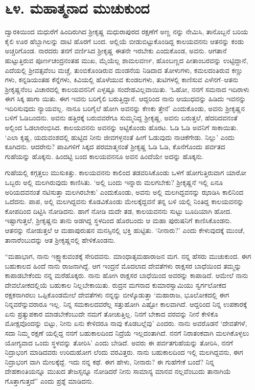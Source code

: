
\chapter{೬೪. ಮಹಾತ್ಮನಾದ ಮುಚುಕುಂದ}

ದ್ವಾರಕಿಯಿಂದ ಮಧುರೆಗೆ ಹಿಂದಿರುಗಿದ ಶ್ರೀಕೃಷ್ಣ ಮಧುರಾಪುರದ ರಕ್ಷಣೆಗೆ ಅಣ್ಣ ನನ್ನು ನೇಮಿಸಿ, ತಾನೊಬ್ಬನೆ ಬರಿಯ ಕೈಲಿ ಊರ ಹೆಬ್ಬಾಗಿಲನ್ನು ದಾಟಿ ಹೊರಗೆ ಬಂದ. ಅಲ್ಲಿಯೆ ಬೀಡುಬಿಟ್ಟುಕೊಂಡಿದ್ದ ಕಾಲಯವನನು ಆತನನ್ನು ಕಂಡು ಅಚ್ಚರಿಗೊಂಡ. ನಾರದರು ತನಗೆ ವರ್ಣಿಸಿದ ಶ್ರೀಕೃಷ್ಣ ಈತನೇ ಇರಬೇಕು ಎಂದುಕೊಂಡ, ಅವನು. ಆಗತಾನೆ ಹುಟ್ಟುತ್ತಿರುವ ಪೂರ್ಣಚಂದ್ರನಂತಹ ಮುಖ, ಮೈಯೆಲ್ಲ ಶಾಮಲವರ್ಣ, ಹೊಂಬಣ್ಣದ ಪೀತಾಂಬರವನ್ನು ಉಟ್ಟಿದ್ದಾನೆ, ಎದೆಯಲ್ಲಿ ಶ್ರೀವತ್ಸವೆಂಬ ಮಚ್ಚೆ, ತುಂಬಿಕೊಂಡಿರುವ ದುಂಡನೆಯ ನಿಡಿದಾದ ತೋಳುಗಳು, ಕಮಲದಂತಿರುವ ಕಣ್ಣು ಗಳು, ಕನ್ನಡಿಯಂತಹ ಕೆನ್ನೆಗಳು, ಕಿವಿಯಲ್ಲಿ ಹೊಳೆಯುವ ಕುಂಡಲಗಳು, ತುಟಿಗಳಲ್ಲಿ ಕಾಣಿಸುವ ಎಳೆನಗೆ–ಆತನು ಶ್ರೀಕೃಷ್ಣನೆಂಬ ವಿಚಾರದಲ್ಲಿ ಕಾಲಯವನನಿಗೆ ಎಳ್ಳಷ್ಟೂ ಸಂದೇಹವಿಲ್ಲವಾಯಿತು. ‘ಓಹೋ, ನನಗೆ ಸಮನಾದ ಇದಿರಾಳು ಈಗ ಸಿಕ್ಕ ಹಾಗಾ ಯಿತು. ಈಗ ಇವನು ಬರಿಗೈಲಿ ಬರುತ್ತಿದ್ದಾನೆ. ಆದ್ದರಿಂದ ನಾನು ಆಯುಧವನ್ನು ಹಿಡಿದು ಇವನನ್ನು ಇದಿರಿಸುವುದು ನ್ಯಾಯವಲ್ಲ. ನಾನೂ ಬರಿಗೈಲೆ ಹೋಗಿ ಅವನನ್ನು ಕೆಣಕು ತ್ತೇನೆ’ ಎಂದುಕೊಂಡು, ಅವನು ಶ್ರೀಕೃಷ್ಣನ ಬಳಿಗೆ ಓಡಿಬಂದನು. ಅವನು ಹತ್ತಿರಕ್ಕೆ ಬರುವವರೆಗೂ ಸುಮ್ಮನಿದ್ದ ಶ್ರೀಕೃಷ್ಣ, ಅವನು ಬರುತ್ತಲೆ, ಹೆದರಿದವನಂತೆ ಅಲ್ಲಿಂದ ಓಡಲಾರಂಭಿಸಿದ. ಕಾಲಯವನನು ಅವನನ್ನು ಅಟ್ಟಿಕೊಂಡು ಹೊರಟ. ಓಡಿ ಓಡಿ ಅವನಿಗೆ ಸಾಕಾಯಿತು. ‘ಎಲಾ ಕೃಷ್ಣ, ಯದುವಂಶದಲ್ಲಿ ಹುಟ್ಟಿದ ನೀನು ಜೀವಗಳ್ಳನಂತೆ ಹೀಗೆ ಓಡುವುದು ನಾಚಿಕೆಗೇಡು. ನಿಲ್ಲು’ ಎಂದು ಕೂಗಿದನು. ಆದರೇನು? ಪಾಪಿಗಳಿಗೆ ಸಿಕ್ಕದ ಪರಮಾತ್ಮನಂತೆ ಶ್ರೀಕೃಷ್ಣ ಓಡಿ ಓಡಿ, ಕೊನೆಗೊಂದು ಪರ್ವತದ ಗುಹೆಯನ್ನು ಹೊಕ್ಕನು. ಹಿಂದಟ್ಟಿ ಬಂದ ಕಾಲಯವನನೂ ಅವನ ಹಿಂದೆಯೇ ಅದನ್ನು ಹೊಕ್ಕನು.

ಗುಹೆಯಲ್ಲಿ ಕಗ್ಗತ್ತಲು ಮುಸುಕಿತ್ತು. ಕಾಲಯವನನು ಕಾಲಿಂದ ತಡವರಿಸಿಕೊಂಡು ಒಳಗೆ ಹೋಗುತ್ತಿರುವಾಗ ಯಾರೋ ಒಬ್ಬರು ಅಲ್ಲಿ ಮಲಗಿರುವುದು ಕಾಣಿಸಿತು. ‘ಅಲ್ಲಿ ಬಂದು ಇನ್ನಾರು ಮಲಗಬೇಕು? ಶ್ರೀಕೃಷ್ಣನೆ ಇಲ್ಲಿ ಏನೂ ಅರಿಯದವನಂತೆ ನಟಿಸುತ್ತಾ ಮಲಗಿರಬೇಕು’ ಎಂದುಕೊಂಡು, ಅವನು ಅಲ್ಲಿ ಮಲಗಿದ್ದವನನ್ನು ಝಾಡಿಸಿ ಕಾಲಿನಿಂದ ಒದೆದನು. ಪಾಪ, ಅಲ್ಲಿ ಮಲಗಿದ್ದವನು ಕೊಡವಿಕೊಂಡು ಮೇಲಕ್ಕೆದ್ದವನೆ ತನ್ನ ಬಳಿ ಯಲ್ಲಿ ನಿಂತಿದ್ದ ಕಾಲಯವನನ್ನು ಕೋಪದಿಂದ ದಿಟ್ಟಿಸಿ ನೋಡಿದನು. ಹಾಗೆ ನೋಡಿ ದುದೇ ತಡ, ಕಾಲಯವನನು ಸುಟ್ಟು ಬೂದಿಯಾಗಿ ಹೋದ. ಇಷ್ಟಾಗುತ್ತಲೆ, ಶ್ರೀಕೃಷ್ಣನು ತಾನು ಅಡಗಿದ್ದ ಸ್ಥಳದಿಂದ ಹೊರಬಂದು ಆ ಮಹಾ ಪುರುಷನಿಗೆ ಕಾಣಿಸಿಕೊಂಡನು. ಆತನನ್ನು ನೋಡುತ್ತಲೆ ಆ ಮಹಾಪುರುಷನ ಮನಸ್ಸಿನಲ್ಲಿ ಭಕ್ತಿ ಹುಟ್ಟಿತು. ‘ನೀನಾರು?’ ಎಂದು ಕೇಳುವುದಕ್ಕೆ ಮುಂಚೆ, ತಾನಾರೆಂಬುದನ್ನು ಆತ ಶ್ರೀಕೃಷ್ಣನಲ್ಲಿ ಹೇಳಿಕೊಂಡನು.

“ಮಹಾಭಾಗ, ನಾನು ಇಕ್ಷ್ವಾಕುವಂಶಕ್ಕೆ ಸೇರಿದವನು. ಮಾಂಧಾತೃಮಹಾರಾಜನ ಮಗ. ನನ್ನ ಹೆಸರು ಮುಚುಕುಂದ. ಈಗ ಬಹುಕಾಲದ ಹಿಂದೆ ನಾನು ರಾಜನಾಗಿದ್ದೆ. ಆಗ ಇಂದ್ರನೆ ಮೊದಲಾದ ದೇವತೆಗಳು ರಾಕ್ಷಸರ ಬಾಧೆಯಿಂದ ತಮ್ಮನ್ನು ಕಾಪಾಡಬೇಕೆಂದು ನನ್ನ ಮರೆಹೊಕ್ಕರು. ನಾನು ಹೋಗಿ ರಾಕ್ಷಸರ ಬಾಧೆಯಿಂದ ಅವರನ್ನು ಕಾಪಾಡಿದೆ. ಆಮೇಲೆ ನಾನು ದೇವಲೋಕದಲ್ಲಿಯೆ ಬಹುಕಾಲ ನಿಲ್ಲಬೇಕಾಯಿತು. ರುದ್ರನ ಮಗನಾದ ಕುಮಾರಸ್ವಾಮಿಯು ಸ್ವರ್ಗಲೋಕದ ರಕ್ಷಕನಾಗಿರಲು ಒಪ್ಪಿಕೊಂಡಮೇಲೆ ದೇವತೆಗಳು ನನ್ನನ್ನು ಬೀಳ್ಕೊಡುತ್ತಾ ‘ಮಹಾರಾಜ, ಭೂಲೋಕದಲ್ಲಿ ಈಗ ನಿನ್ನವರೆನ್ನುವರಾರೂ ಇಲ್ಲ. ನಿನ್ನ ಸಮಕಾಲದವರೆಲ್ಲ ಸತ್ತುಹೋಗಿ ಎಷ್ಟೋ ಕಾಲವಾಗಿದೆ. ಆದ್ದರಿಂದ ನಿನ್ನ ಉಪಕಾರಕ್ಕೆ ಏನು ಪ್ರತ್ಯುಪಕಾರ ಮಾಡಬೇಕೆಂಬುದೇ ನಮಗೆ ತೋಚುತ್ತಿಲ್ಲ. ನಿನಗೆ ಬೇಕಾದ ವರವನ್ನು ನೀನೆ ಕೇಳಿಕೊ ಮೋಕ್ಷವೊಂದನ್ನು ಬಿಟ್ಟು, ನೀನು ಏನು ಕೇಳಿದರೂ ನಾವು ಕೊಡಬಲ್ಲೆವು’ ಎಂದರು. ನಾನು ಅವರೊಡನೆ ‘ದೇವತೆಗಳೆ, ಸದಾ ನಿಮ್ಮ ರಕ್ಷಣೆ ಯಲ್ಲಿದ್ದ ನನಗೆ ಬಹುಕಾಲದಿಂದ ನಿದ್ರೆಯೆ ಇಲ್ಲದಂತಾಗಿದೆ. ನನಗೆ ನಿರಾತಂಕವಾಗಿ ಮಲಗಿಕೊಳ್ಳಲು ಯೋಗ್ಯವಾದ ಒಂದು ಸ್ಥಳವನ್ನು ತೋರಿಸಿ’ ಎಂದು ಬೇಡಿದೆ. ಅವರು ಈ ಪರ್ವತಗುಹೆಯನ್ನು ತೋರಿಸಿ, ನನಗೆ ನಿದ್ರಾಭಂಗ ಮಾಡಿದವರು ಉರಿದುಹೋಗ ಲೆಂದು ವರವಿತ್ತರು. ನಾನು ಬಹುಕಾಲದಿಂದ ಇಲ್ಲಿ ಮಲಗಿದ್ದವನು, ಈಗ ನಿದ್ರಾಭಂಗ ವಾಗಿ ಮೇಲಕ್ಕೆದ್ದೆ. ಇದು ನನ್ನ ಕಥೆ. ಈಗ ಹೇಳು, ನೀನಾರು? ಈ ಗುಹೆಗೇಕೆ ಬಂದೆ? ನಿನ್ನ ದೇಹಕಾಂತಿಯನ್ನೂ ಮುಖದ ತೇಜಸ್ಸನ್ನೂ ನೋಡಿದರೆ ನೀನು ಸಾಮಾನ್ಯ ಮಾನವ ನಲ್ಲವೆಂಬುದು ತಾನಾಗಿಯೆ ಗೊತ್ತಾಗುತ್ತದೆ” ಎಂದು ಪ್ರಶ್ನೆ ಮಾಡಿದನು.

